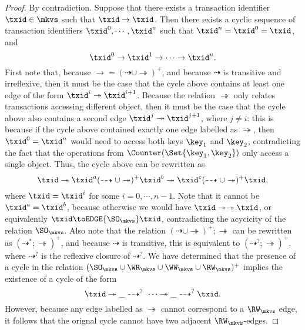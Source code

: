 \begin{proof}
By contradiction. Suppose that there exists a transaction identifier $\txid \in \mkvs$ such that 
$\txid \rightarrow \txid$. Then there exists a cyclic sequence of transaction identifiers 
$\txid^{0}, \cdots, \txid^{n}$ such that $\txid^{n} =  \txid^{0} = \txid$, and
\[ 
\txid^{0} \rightarrow \txid^{1} \rightarrow \cdots \rightarrow \txid^{n}.
\]
First note that, because $\rightarrow = (\dashrightarrow \cup \twoheadrightarrow)^{+}$, 
and because $\dashrightarrow$ is transitive and irreflexive, then it must be the 
case that the cycle above contains at least one edge of the form $\txid^{i} \twoheadrightarrow \txid^{i+1}$. 
Because the relation $\twoheadrightarrow$ only relates transactions accessing different object, 
then it must be the case that the cycle above also contains a second edge $\txid^{j} \twoheadrightarrow \txid^{j+1}$, 
where $j \neq i$: this is because if the cycle above contained exactly one edge labelled as $\twoheadrightarrow$, 
then $\txid^{0} = \txid^{n}$ would need to access both keys $\key_1$ and $\key_2$, contradicting the 
fact that the operations from $\Counter(\Set{\key_1, \key_2})$ only access a single object. 
Thus, the cycle above can be rewritten as 
\[ 
\txid \twoheadrightarrow \txid^{a} (\dashrightarrow \cup \twoheadrightarrow)^{+} \txid^{b} \twoheadrightarrow  \txid^{c} (\dashrightarrow \cup \twoheadrightarrow)^{+} \txid, 
\]
where $\txid = \txid^{i}$ for some $i=0,\cdots, n-1$. Note that it cannot be $\txid^{a} = \txid^{b}$, because 
otherwise we would have $\txid \twoheadrightarrow \twoheadrightarrow \txid$, or equivalently 
$\txid \toEDGE{\SO_{\mkvs}} \txid$, contradicting the acycicity of the relation $\SO_{\mkvs}$. 
Also note that the relation $(\dashrightarrow \cup \twoheadrightarrow)^{+} ; \twoheadrightarrow$ can be rewritten as 
$(\dashrightarrow^{*} ; \twoheadrightarrow)^{+}$, and because $\dashrightarrow$ is transitive, 
this is equivalent to $(\dashrightarrow^{?} ; \twoheadrightarrow)^{+}$, where $\dashrightarrow^{?}$ is 
the reflexive closure of $\dashrightarrow^{?}$. 
We have determined that the presence of a cycle in the relation $(\SO_{\mkvs} \cup \WR_{\mkvs} \cup \WW_{\mkvs} \cup \RW_{\mkvs})^{+}$ 
implies the existence of a cycle of the form 
\[
\txid \twoheadrightarrow \_ \dashrightarrow^{?} \ \cdots \twoheadrightarrow \_ \dashrightarrow^{?} \txid.
\]
However, because any edge labelled as $\twoheadrightarrow$ cannot correspond to a $\RW_{\mkvs}$ edge, 
it follows that the orignal cycle cannot have two adjacent $\RW_{\mkvs}$-edges. 
%

\end{proof}
